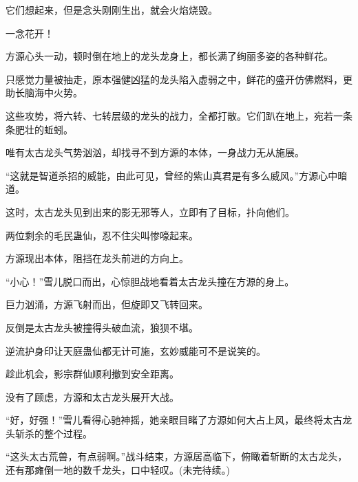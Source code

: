 \begin{this_body}
它们想起来，但是念头刚刚生出，就会火焰烧毁。

一念花开！

方源心头一动，顿时倒在地上的龙头龙身上，都长满了绚丽多姿的各种鲜花。

只感觉力量被抽走，原本强健凶猛的龙头陷入虚弱之中，鲜花的盛开仿佛燃料，更助长脑海中火势。

这些攻势，将六转、七转层级的龙头的战力，全都打散。它们趴在地上，宛若一条条肥壮的蚯蚓。

唯有太古龙头气势汹汹，却找寻不到方源的本体，一身战力无从施展。

“这就是智道杀招的威能，由此可见，曾经的紫山真君是有多么威风。”方源心中暗道。

这时，太古龙头见到出来的影无邪等人，立即有了目标，扑向他们。

两位剩余的毛民蛊仙，忍不住尖叫惨嚎起来。

方源现出本体，阻挡在龙头前进的方向上。

“小心！”雪儿脱口而出，心惊胆战地看着太古龙头撞在方源的身上。

巨力汹涌，方源飞射而出，但旋即又飞转回来。

反倒是太古龙头被撞得头破血流，狼狈不堪。

逆流护身印让天庭蛊仙都无计可施，玄妙威能可不是说笑的。

趁此机会，影宗群仙顺利撤到安全距离。

没有了顾虑，方源和太古龙头展开大战。

“好，好强！”雪儿看得心驰神摇，她亲眼目睹了方源如何大占上风，最终将太古龙头斩杀的整个过程。

“这头太古荒兽，有点弱啊。”战斗结束，方源居高临下，俯瞰着斩断的太古龙头，还有那瘫倒一地的数千龙头，口中轻叹。(未完待续。)

\end{this_body}

